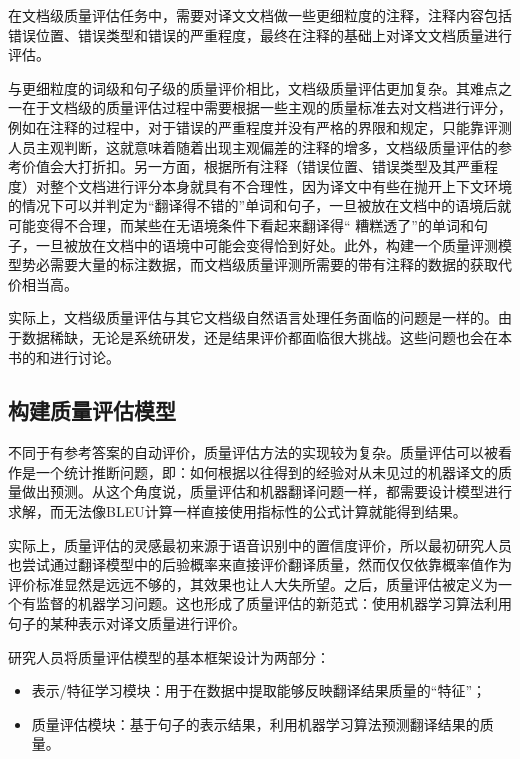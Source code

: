 \parinterval 在文档级质量评估任务中，需要对译文文档做一些更细粒度的注释，注释内容包括错误位置、错误类型和错误的严重程度，最终在注释的基础上对译文文档质量进行评估。

\parinterval 与更细粒度的词级和句子级的质量评价相比，文档级质量评估更加复杂。其难点之一在于文档级的质量评估过程中需要根据一些主观的质量标准去对文档进行评分，例如在注释的过程中，对于错误的严重程度并没有严格的界限和规定，只能靠评测人员主观判断，这就意味着随着出现主观偏差的注释的增多，文档级质量评估的参考价值会大打折扣。另一方面，根据所有注释（错误位置、错误类型及其严重程度）对整个文档进行评分本身就具有不合理性，因为译文中有些在抛开上下文环境的情况下可以并判定为“翻译得不错的”单词和句子，一旦被放在文档中的语境后就可能变得不合理，而某些在无语境条件下看起来翻译得“ 糟糕透了”的单词和句子，一旦被放在文档中的语境中可能会变得恰到好处。此外，构建一个质量评测模型势必需要大量的标注数据，而文档级质量评测所需要的带有注释的数据的获取代价相当高。

\parinterval 实际上，文档级质量评估与其它文档级自然语言处理任务面临的问题是一样的。由于数据稀缺，无论是系统研发，还是结果评价都面临很大挑战。这些问题也会在本书的{\chaptersixteen}和{\chapterseventeen}进行讨论。


\subsection{构建质量评估模型}

\parinterval 不同于有参考答案的自动评价，质量评估方法的实现较为复杂。质量评估可以被看作是一个统计推断问题，即：如何根据以往得到的经验对从未见过的机器译文的质量做出预测。从这个角度说，质量评估和机器翻译问题一样，都需要设计模型进行求解，而无法像BLEU计算一样直接使用指标性的公式计算就能得到结果。

\parinterval 实际上，质量评估的灵感最初来源于语音识别中的置信度评价，所以最初研究人员也尝试通过翻译模型中的后验概率来直接评价翻译质量，然而仅仅依靠概率值作为评价标准显然是远远不够的，其效果也让人大失所望。之后，质量评估被定义为一个有监督的机器学习问题。这也形成了质量评估的新范式：使用机器学习算法利用句子的某种表示对译文质量进行评价。

\parinterval 研究人员将质量评估模型的基本框架设计为两部分：

\begin{itemize}
\vspace{0.5em}
\item 表示/特征学习模块：用于在数据中提取能够反映翻译结果质量的“特征”；
\vspace{0.5em}
\item 质量评估模块：基于句子的表示结果，利用机器学习算法预测翻译结果的质量。
\end{itemize}

